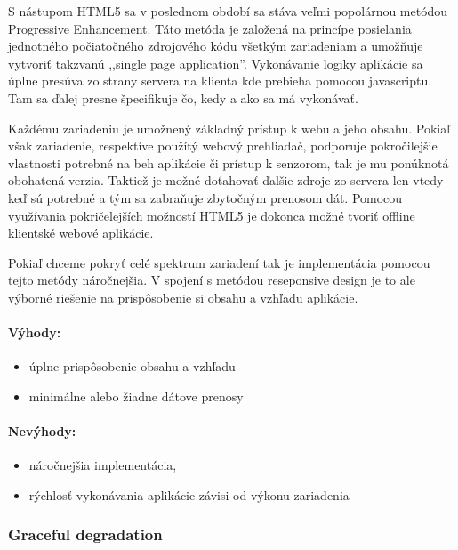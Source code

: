 S nástupom HTML5 sa v poslednom období sa stáva veľmi popolárnou metódou Progressive Enhancement. Táto metóda je založená na princípe posielania jednotného počiatočného zdrojového kódu všetkým zariadeniam a umožňuje vytvoriť takzvanú ,,single page application''. Vykonávanie logiky aplikácie sa úplne presúva zo strany servera na klienta kde prebieha pomocou javascriptu. Tam sa ďalej presne špecifikuje čo, kedy a ako sa má vykonávať. 

Každému zariadeniu je umožnený základný prístup k webu a jeho obsahu. Pokiaľ však zariadenie, respektíve použítý webový prehliadač, podporuje pokročilejšie vlastnosti potrebné na beh aplikácie či prístup k senzorom, tak je mu ponúknotá obohatená verzia. Taktiež je možné doťahovať ďalšie zdroje zo servera len vtedy keď sú potrebné a tým sa zabraňuje zbytočným prenosom dát. Pomocou využívania pokričelejších možností HTML5 je dokonca možné tvoriť offline klientské webové aplikácie.

Pokiaľ chceme pokryť celé spektrum zariadení tak je implementácia pomocou tejto metódy náročnejšia. V spojení s metódou reseponsive design je to ale výborné riešenie na prispôsobenie si obsahu a vzhľadu aplikácie.

\paragraph{Výhody:}
\begin{itemize}
	\item úplne prispôsobenie obsahu a vzhľadu
  \item minimálne alebo žiadne dátove prenosy
\end{itemize}

\paragraph{Nevýhody:}
\begin{itemize}
	\item náročnejšia implementácia, 
	\item rýchlosť vykonávania aplikácie závisi od výkonu zariadenia
\end{itemize}


\subsubsection{Graceful degradation} %
\label{ssub:graceful_degradation}

